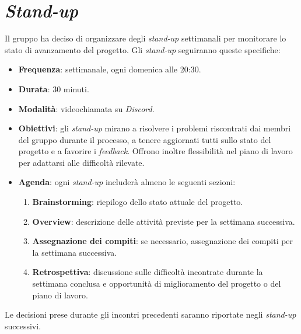 \section{\textit{Stand-up}}

Il gruppo ha deciso di organizzare degli \textit{stand-up} settimanali per
monitorare lo stato di avanzamento del progetto. Gli \textit{stand-up}
seguiranno queste
specifiche:

\begin{itemize}
	\item \textbf{Frequenza}: settimanale, ogni domenica alle 20:30.

	\item \textbf{Durata}: 30 minuti.

	\item \textbf{Modalità}: videochiamata su \textit{Discord}.

	\item \textbf{Obiettivi}: gli \textit{stand-up} mirano a risolvere i
	      problemi riscontrati dai membri del gruppo durante il processo, a tenere
	      aggiornati tutti sullo stato del progetto e a favorire i
	      \textit{feedback}. Offrono inoltre flessibilità nel piano di lavoro per
	      adattarsi alle difficoltà rilevate.

	\item \textbf{Agenda}: ogni \textit{stand-up} includerà almeno le seguenti
	      sezioni:
	      \begin{enumerate}
		      \item \textbf{Brainstorming}: riepilogo dello stato attuale del
		            progetto.

		      \item \textbf{Overview}: descrizione delle attività previste per
		            la settimana successiva.

		      \item \textbf{Assegnazione dei compiti}: se necessario,
		            assegnazione dei compiti per la settimana successiva.

		      \item \textbf{Retrospettiva}: discussione sulle difficoltà
		            incontrate durante la settimana conclusa e opportunità di
		            miglioramento del progetto o del piano di lavoro.
	      \end{enumerate}
\end{itemize}

Le decisioni prese durante gli incontri precedenti saranno riportate negli
\textit{stand-up} successivi.

